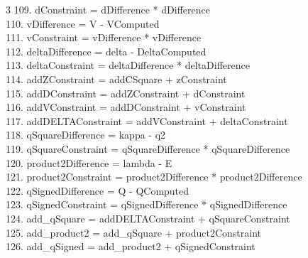 \documentclass[10pt]{article}
\begin{document}
\begin{multicols}{3}
109. dConstraint = dDifference * dDifference\\
110. vDifference = V - VComputed\\
111. vConstraint = vDifference * vDifference\\
112. deltaDifference = delta - DeltaComputed\\
113. deltaConstraint = deltaDifference * deltaDifference\\
114. addZConstraint = addCSquare + zConstraint\\
115. addDConstraint = addZConstraint + dConstraint\\
116. addVConstraint = addDConstraint + vConstraint\\
117. addDELTAConstraint = addVConstraint + deltaConstraint\\
118. qSquareDifference = kappa - q2\\
119. qSquareConstraint = qSquareDifference * qSquareDifference\\
120. product2Difference = lambda - E\\
121. product2Constraint = product2Difference * product2Difference\\
122. qSignedDifference = Q - QComputed\\
123. qSignedConstraint = qSignedDifference * qSignedDifference\\
124. add\_qSquare = addDELTAConstraint + qSquareConstraint\\
125. add\_product2 = add\_qSquare + product2Constraint\\
126. add\_qSigned = add\_product2 + qSignedConstraint\\
\end{multicols}
\end{document}
